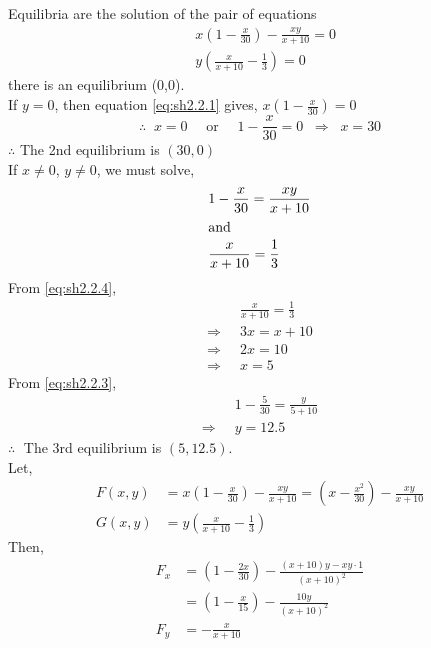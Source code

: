 \documentclass[../main-sheet.tex]{subfiles}
\begin{document}
\begin{soln}
    Equilibria are the solution of the pair of equations
    \begin{align}
        &x\left( 1-\frac{x}{30} \right)-\frac{xy}{x+10}=0\label{eq:sh2.2.1}\\
        &y\left( \frac{x}{x+10}-\frac{1}{3} \right)=0\label{eq:sh2.2.2}
    \end{align}
    there is an equilibrium (0,0).\\
    If \(y=0\), then equation \eqref{eq:sh2.2.1} gives, \(x\left( 1-\frac{x}{30} \right)=0\)\\
    \[\therefore\;\;x=0\quad\text{ or }\quad 1-\frac{x}{30}=0\;\;\Rightarrow\;\;x=30\]
    \(\therefore \) The 2nd equilibrium is \((30,0)\)\\
    If \(x\neq 0\), \(y\neq 0\), we must solve,
    \begin{align}
        &1-\frac{x}{30}=\frac{xy}{x+10}\label{eq:sh2.2.3}\\
        \intertext{and}
        &\frac{x}{x+10}=\frac{1}{3}\label{eq:sh2.2.4}
    \end{align}
    From \eqref{eq:sh2.2.4},
    \begin{align*}
        &\frac{x}{x+10}=\frac{1}{3}\\
        \Rightarrow\;\;&3x=x+10\\
        \Rightarrow\;\;&2x=10\\
        \Rightarrow\;\;&x=5
    \end{align*}
    From \eqref{eq:sh2.2.3},
    \begin{align*}
        &1-\frac{5}{30}=\frac{y}{5+10}\\
        \Rightarrow\;\;&y=12.5
    \end{align*}
    \(\therefore\;\) The 3rd equilibrium is \((5,12.5)\).\\
    Let, \begin{align*}
        F(x,y)&=x\left( 1-\frac{x}{30} \right)-\frac{xy}{x+10}=\left( x-\frac{x^2}{30} \right)-\frac{xy}{x+10}\\
        G(x,y)&=y\left( \frac{x}{x+10}-\frac{1}{3} \right)
    \end{align*}
    Then,
    \begin{align*}
        F_x&=\left( 1-\frac{2x}{30} \right)-\frac{(x+10)y-xy\cdot 1}{(x+10)^2}\\
        &=\left( 1-\frac{x}{15} \right)-\frac{10y}{(x+10)^2}\\
        F_y&=-\frac{x}{x+10}\\

\end{align*}
\end{soln}
\end{document}
